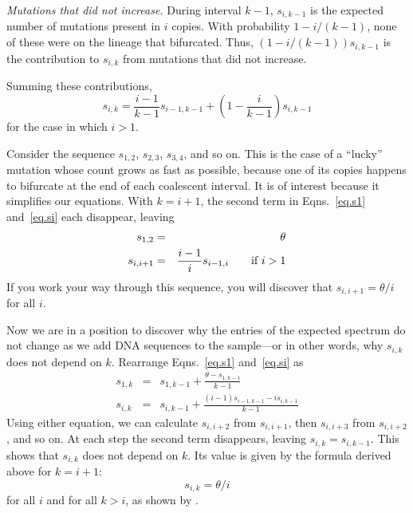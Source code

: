 \documentclass[12pt,twocolumn]{article}
\begin{document}
\emph{Mutations that did not increase.} During interval $k-1$,
$s_{i,k-1}$ is the expected number of mutations present in $i$ copies.
With probability $1 - i/(k-1)$, none of these were on the lineage that
bifurcated. Thus, $(1 - i/(k-1))s_{i,k-1}$ is the contribution to
$s_{i,k}$ from mutations that did not increase.

Summing these contributions,
\begin{equation}
  s_{i,k} = \frac{i-1}{k-1}s_{i-1,k-1} + \left(1 -
  \frac{i}{k-1}\right)s_{i,k-1}
  \label{eq.si}
\end{equation}
for the case in which $i>1$.

Consider the sequence $s_{1,2}$, $s_{2,3}$, $s_{3,4}$, and so on. This
is the case of a ``lucky'' mutation whose count grows as fast as
possible, because one of its copies happens to bifurcate at the end of
each coalescent interval. It is of interest because it simplifies our
equations. With $k=i+1$, the second term in Eqns.~\ref{eq.s1}
and~\ref{eq.si} each disappear, leaving
\begin{eqnarray*}
s_{1,2} &=& \theta\\
s_{i,i+1} &=& \frac{i-1}{i}s_{i-1,i} \qquad \hbox{if $i>1$}
\end{eqnarray*}
If you work your way through this sequence, you will discover that
$s_{i, i+1} = \theta/i$ for all $i$.

Now we are in a position to discover why the entries of the expected
spectrum do not change as we add DNA sequences to the sample---or in
other words, why $s_{i,k}$ does not depend on $k$.  Rearrange
Eqns.~\ref{eq.s1} and~\ref{eq.si} as
\begin{eqnarray*}
  s_{1,k} &=& s_{1, k-1} + \frac{\theta - s_{1, k-1}}{k-1}\\
  s_{i,k} &=& s_{i,k-1} + \frac{(i-1)s_{i-1,k-1} - i s_{i,k-1}}{k-1}
\end{eqnarray*}
Using either equation, we can calculate $s_{i,i+2}$ from $s_{i,i+1}$,
then $s_{i,i+3}$ from $s_{i,i+2}$, and so on.  At each step the second
term disappears, leaving $s_{i,k} = s_{i, k-1}$.  This shows that
$s_{i,k}$ does not depend on $k$.  Its value is given by the formula
derived above for $k=i+1$:
\begin{equation}
s_{i,k} = \theta/i 
\label{eq.spec}
\end{equation}
for all $i$ and for all $k>i$, as shown by
\citet[Eqn.~22]{Fu:TPB-48-172}.



\end{document}
